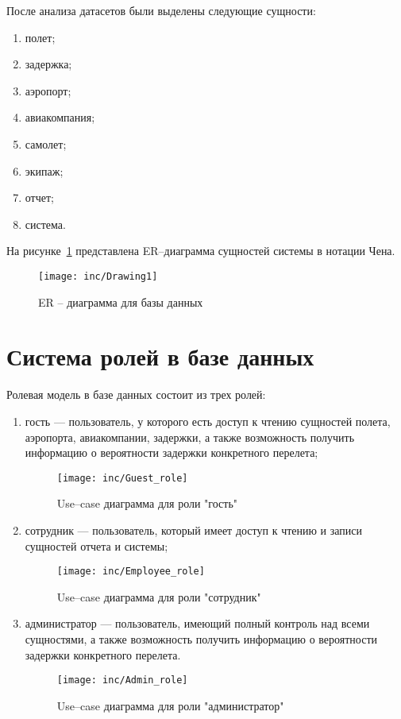 После анализа датасетов были выделены следующие сущности:
\begin{enumerate}[label=\arabic*)]
    \item полет;
    \item задержка;
    \item аэропорт;
    \item авиакомпания;
    \item самолет;
    \item экипаж;
    \item отчет;
    \item система.
\end{enumerate}

На рисунке~\ref{fig:er} представлена ER--диаграмма сущностей системы в нотации Чена.

\begin{figure}[H]
    \centering
    \texttt{[image: inc/Drawing1]}
    \caption{ER -- диаграмма для базы данных}
    \label{fig:er}
\end{figure}

\section{Система ролей в базе данных}

Ролевая модель в базе данных состоит из трех ролей:
\begin{enumerate}[label=\arabic*)]
    \item гость --- пользователь, у которого есть доступ к чтению сущностей полета, аэропорта, авиакомпании, задержки, а также возможность получить информацию о вероятности задержки конкретного перелета;
    \begin{figure}[H]
        \centering
        \texttt{[image: inc/Guest\_role]}
        \caption{Use--case диаграмма для роли "гость"}
        \label{fig:guest_role}
    \end{figure}

    \item сотрудник --- пользователь, который имеет доступ к чтению и записи сущностей отчета и системы;
    \begin{figure}[H]
        \centering
        \texttt{[image: inc/Employee\_role]}
        \caption{Use--case диаграмма для роли "сотрудник"}
        \label{fig:client_role}
    \end{figure}

    \item администратор --- пользователь, имеющий полный контроль над всеми сущностями, а также возможность получить информацию о вероятности задержки конкретного перелета.
    \begin{figure}[H]
        \centering
        \texttt{[image: inc/Admin\_role]}
        \caption{Use--case диаграмма для роли "администратор"}
        \label{fig:admin_role}
    \end{figure}
\end{enumerate}
\newpage


